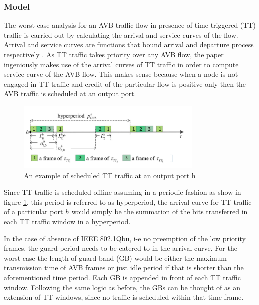\documentclass[journal,12pt,twocolumn]{IEEEtran}
\begin{document}
\subsubsection {Model}
The worst case analysis for an AVB traffic flow in presence of time triggered (TT) traffic is carried out by calculating the arrival and service curves of the flow. Arrival and service curves are functions that bound arrival and departure process respectively \cite{NCBackground}. As TT traffic takes priority over any AVB flow, the paper ingeniously makes use of the arrival curves of TT traffic in order to compute service curve of the AVB flow. This makes sense because when a node is not engaged in TT traffic and credit of the particular flow is positive only then the AVB traffic is scheduled at an output port.
\begin{figure}
\centering
\includegraphics[width=3.5in]{NC_TT}
\caption{An example of scheduled TT traffic at an output port h }
\label{NC_TT}
\end{figure}
Since TT traffic is scheduled offline assuming in a periodic fashion as show in figure \ref{NC_TT}, this period is referred to as hyperperiod, the arrival curve for TT traffic of a particular port $h$ would simply be the summation of the bits transferred in each TT traffic window in a hyperperiod.

In the case of absence of IEEE  802.1Qbu, i-e no preemption of the low priority frames, the guard period needs to be catered to in the arrival curve. For the worst case the length of guard band (GB) would be either the maximum transmission time of AVB frames or just idle period if that is shorter than the aforementioned time period. Each GB is appended in front of each TT traffic window. Following the same logic as before, the GBs can be thought of as an extension of TT windows, since no traffic is scheduled within that time frame.
\end{document}
